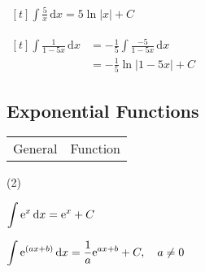 \documentclass[11pt,a4paper]{book}
\begin{document}
\begin{example}
\begin{tasks}[label=(\alph*),label-width=3.5ex,after-item-skip = 1cm]
\task
$
\begin{aligned}[t]
\int\frac{5}{x}\,\mathrm{d}x=5\ln\left|x\right|+C
\end{aligned}
$

\task
$
\begin{aligned}[t]
\int\frac{1}{1-5x}\,\mathrm{d}x & =-\frac{1}{5}\int\frac{-5}{1-5x}\,\mathrm{d}x\\
 & =-\frac{1}{5}\ln\left|1-5x\right|+C
\end{aligned}
$

\end{tasks}

\end{example}

\newpage

\subsection{Exponential Functions}

\begin{tcolorbox}[colback=blue!5, colframe=black, boxrule=.4pt, sharpish corners]

\begin{tabular}{>{\centering}p{4.5cm}>{\centering}p{10cm}}
General & Function\tabularnewline
\end{tabular}

\begin{tasks}[style=itemize,label-width=3.5ex,column-sep=-1cm](2)

\task ${\displaystyle \int{\rm e}^{x}\, \mathrm{d}x=\mathrm{e}^{x}+C}$

\task ${\displaystyle \int{\rm e}^{(ax+b)}\, \mathrm{d}x=\frac{1}{a}{\rm e}^{ax+b}+C,\quad a\ne0}$

\end{tasks}
\end{tcolorbox}
\end{document}
